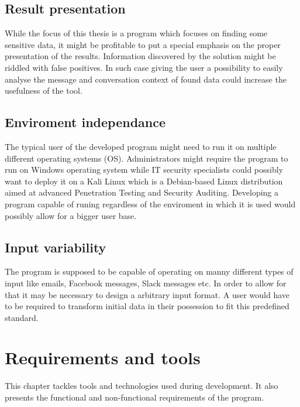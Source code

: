 \documentclass[a4paper,twoside,12pt]{book}
\begin{document}
\section{Result presentation}

While the focus of this thesis is a program which focuses on finding some sensitive data, it might be profitable to put a special emphasis on the proper
presentation of the results. Information discovered by the solution might be riddled with false positives. In such case giving the user a possibility
to easily analyse the message and conversation context of found data could increase the usefulness of the tool. 

\section{Enviroment independance}

The typical user of the developed program might need to run it on multiple different operating systems (OS). Administrators might require the program to run
on Windows operating system while IT security specialists could possibly want to deploy it on a Kali Linux which is a Debian-based Linux distribution 
aimed at advanced Penetration Testing and Security Auditing. Developing a program capable of runing regardless of the enviroment in which it is used would possibly
allow for a bigger user base.

\section{Input variability}

The program is supposed to be capable of operating on manny different types of input like emails, Facebook messages, Slack messages etc. In order to 
allow for that it may be necessary to design a arbitrary input format. A user would have to be required to transform initial data in their possession to 
fit this predefined standard. 

\chapter{Requirements and tools}

This chapter tackles tools and technologies used during development. It also presents the functional and non-functional requirements of the program.
\end{document}
